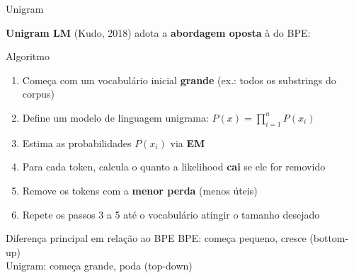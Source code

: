 \documentclass[aspectratio=169,xcolor=dvipsnames]{beamer}
\begin{document}
\begin{frame}{Unigram}

\textbf{Unigram LM} (Kudo, 2018) adota a \textbf{abordagem oposta} à do BPE:

\vspace{6pt}

\begin{block}{Algoritmo}
\begin{enumerate}
    \item Começa com um vocabulário inicial \textbf{grande} (ex.: todos os substrings do corpus)
    \item Define um modelo de linguagem unigrama: $P(x) = \prod_{i=1}^{n} P(x_i)$
    \item Estima as probabilidades $P(x_i)$ via \textbf{EM}
    \item Para cada token, calcula o quanto a likelihood \textbf{cai} se ele for removido
    \item Remove os tokens com a \textbf{menor perda} (menos úteis)
    \item Repete os passos 3 a 5 até o vocabulário atingir o tamanho desejado
\end{enumerate}
\end{block}

\vspace{6pt}

\begin{alertblock}{Diferença principal em relação ao BPE}
BPE: começa pequeno, cresce (bottom-up) \\
Unigram: começa grande, poda (top-down)
\end{alertblock}

\end{frame}

\end{document}
